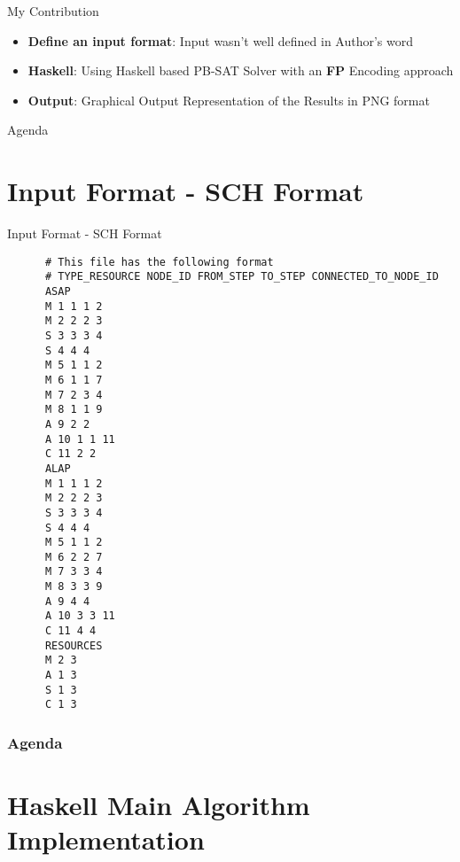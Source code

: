 \documentclass{beamer}
\begin{document}
\begin{frame}[fragile]{My Contribution}
  \begin{block}{}
    \begin{itemize}
      \item \textbf{Define an input format}: Input wasn't well defined in Author's word
      \item \textbf{Haskell}: Using Haskell based PB-SAT Solver with an \textbf{FP} Encoding approach
      \item \textbf{Output}: Graphical Output Representation of the Results in PNG format
    \end{itemize}
  \end{block}
\end{frame}

\begin{frame}{Agenda}
  \section{Input Format - SCH Format}
  \tableofcontents[currentsection]
\end{frame}

\begin{frame}[fragile]{Input Format - SCH Format}
    \begin{verbatim}
      # This file has the following format
      # TYPE_RESOURCE NODE_ID FROM_STEP TO_STEP CONNECTED_TO_NODE_ID
      ASAP
      M 1 1 1 2
      M 2 2 2 3
      S 3 3 3 4
      S 4 4 4
      M 5 1 1 2
      M 6 1 1 7
      M 7 2 3 4
      M 8 1 1 9
      A 9 2 2
      A 10 1 1 11
      C 11 2 2
      ALAP
      M 1 1 1 2
      M 2 2 2 3
      S 3 3 3 4
      S 4 4 4
      M 5 1 1 2
      M 6 2 2 7
      M 7 3 3 4
      M 8 3 3 9
      A 9 4 4
      A 10 3 3 11
      C 11 4 4
      RESOURCES
      M 2 3
      A 1 3
      S 1 3
      C 1 3
    \end{verbatim}  
\end{frame}

\begin{frame}
  \frametitle{Agenda}
  \section{Haskell Main Algorithm Implementation}
  \tableofcontents[currentsection]
\end{frame}
\end{document}
